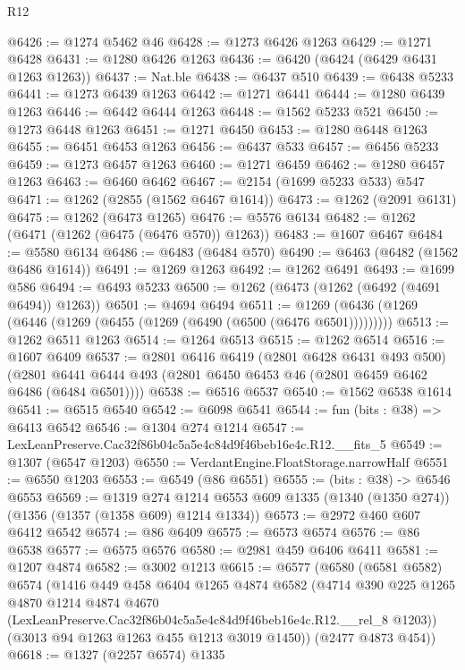 \begin{lexlean}{R12}
\begin{coremodule}
@6426 := @1274 @5462 @46
@6428 := @1273 @6426 @1263
@6429 := @1271 @6428
@6431 := @1280 @6426 @1263
@6436 := @6420 (@6424 (@6429 @6431 @1263 @1263))
@6437 := Nat.ble
@6438 := @6437 @510
@6439 := @6438 @5233
@6441 := @1273 @6439 @1263
@6442 := @1271 @6441
@6444 := @1280 @6439 @1263
@6446 := @6442 @6444 @1263
@6448 := @1562 @5233 @521
@6450 := @1273 @6448 @1263
@6451 := @1271 @6450
@6453 := @1280 @6448 @1263
@6455 := @6451 @6453 @1263
@6456 := @6437 @533
@6457 := @6456 @5233
@6459 := @1273 @6457 @1263
@6460 := @1271 @6459
@6462 := @1280 @6457 @1263
@6463 := @6460 @6462
@6467 := @2154 (@1699 @5233 @533) @547
@6471 := @1262 (@2855 (@1562 @6467 @1614))
@6473 := @1262 (@2091 @6131)
@6475 := @1262 (@6473 @1265)
@6476 := @5576 @6134
@6482 := @1262 (@6471 (@1262 (@6475 (@6476 @570)) @1263))
@6483 := @1607 @6467
@6484 := @5580 @6134
@6486 := @6483 (@6484 @570)
@6490 := @6463 (@6482 (@1562 @6486 @1614))
@6491 := @1269 @1263
@6492 := @1262 @6491
@6493 := @1699 @586
@6494 := @6493 @5233
@6500 := @1262 (@6473 (@1262 (@6492 (@4691 @6494)) @1263))
@6501 := @4694 @6494
@6511 := @1269 (@6436 (@1269 (@6446 (@1269 (@6455 (@1269 (@6490 (@6500 (@6476 @6501)))))))))
@6513 := @1262 @6511 @1263
@6514 := @1264 @6513
@6515 := @1262 @6514
@6516 := @1607 @6409
@6537 := @2801
    @6416
    @6419
    (@2801 @6428 @6431 @493 @500)
    (@2801 @6441 @6444 @493 (@2801 @6450 @6453 @46 (@2801 @6459 @6462 @6486 (@6484 @6501))))
@6538 := @6516 @6537
@6540 := @1562 @6538 @1614
@6541 := @6515 @6540
@6542 := @6098 @6541
@6544 := fun (bits : @38) => @6413 @6542
@6546 := @1304 @274 @1214
@6547 := LexLeanPreserve.Cac32f86b04c5a5e4c84d9f46beb16e4c.R12.__fits_5
@6549 := @1307 (@6547 @1203)
@6550 := VerdantEngine.FloatStorage.narrowHalf
@6551 := @6550 @1203
@6553 := @6549 (@86 @6551)
@6555 := (bits : @38) -> @6546 @6553
@6569 := @1319
    @274
    @1214
    @6553
    @609
    @1335
    (@1340 (@1350 @274))
    (@1356 (@1357 (@1358 @609) @1214 @1334))
@6573 := @2972 @460 @607 @6412 @6542
@6574 := @86 @6409
@6575 := @6573 @6574
@6576 := @86 @6538
@6577 := @6575 @6576
@6580 := @2981 @459 @6406 @6411
@6581 := @1207 @4874
@6582 := @3002 @1213
@6615 := @6577
    (@6580
      (@6581 @6582)
      @6574
      (@1416
        @449
        @458
        @6404
        @1265
        @4874
        @6582
        (@4714
          @390
          @225
          @1265
          @4870
          @1214
          @4874
          @4670
          (LexLeanPreserve.Cac32f86b04c5a5e4c84d9f46beb16e4c.R12.__rel_8 @1203))
        (@3013 @94 @1263 @1263 @455 @1213 @3019 @1450))
      (@2477 @4873 @454))
@6618 := @1327 (@2257 @6574) @1335

\end{coremodule}
\end{lexlean}
